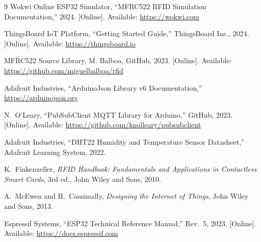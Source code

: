 \documentclass[12pt,a4paper]{article}
\begin{document}
\begin{thebibliography}{9}
  Wokwi Online ESP32 Simulator, ``MFRC522 RFID Simulation Documentation,'' 2024.
  [Online]. Available: \url{https://wokwi.com}

  ThingsBoard IoT Platform, ``Getting Started Guide,'' ThingsBoard Inc., 2024.
  [Online]. Available: \url{https://thingsboard.io}

  MFRC522 Source Library, M. Balboa, GitHub, 2023.
  [Online]. Available: \url{https://github.com/miguelbalboa/rfid}

  Adafruit Industries, ``ArduinoJson Library v6 Documentation,'' \url{https://arduinojson.org}

  N.~O'Leary, ``PubSubClient MQTT Library for Arduino,'' GitHub, 2023.
  [Online]. Available: \url{https://github.com/knolleary/pubsubclient}

  Adafruit Industries, ``DHT22 Humidity and Temperature Sensor Datasheet,''
  Adafruit Learning System, 2022.

  K.~Finkenzeller, \textit{RFID Handbook: Fundamentals and Applications in
  Contactless Smart Cards}, 3rd ed., John Wiley and Sons, 2010.

  A.~McEwen and H.~Cassimally, \textit{Designing the Internet of Things},
  John Wiley and Sons, 2013.

  Espressif Systems, ``ESP32 Technical Reference Manual,'' Rev.\ 5, 2023.
  [Online]. Available: \url{https://docs.espressif.com}
\end{thebibliography}
\end{document}
